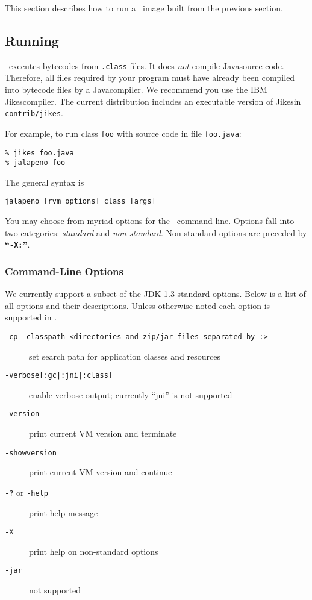 This section describes how to run a \jp\ image built from the previous
section. 

\subsection{Running \jp}

\jp\ executes bytecodes from {\tt .class} files. It does {\em not} compile
Java\trademark source code. Therefore, all files 
required by your program must have already been compiled into bytecode
files by a Java\trademark compiler.  We recommend you use the IBM Jikes\trademark compiler.
The current distribution includes an executable version of Jikes\trademark in
{\tt contrib/jikes}.

For example, to run class {\tt foo} with source code in file {\tt foo.java}:
\begin{verbatim}
% jikes foo.java
% jalapeno foo 
\end{verbatim}

The general syntax is
\begin{verbatim}
jalapeno [rvm options] class [args]
\end{verbatim}

You may choose from myriad options for the \jp\ command-line.  
Options fall into two categories: {\em standard} and {\em
non-standard}.  Non-standard options are preceded by {\bf ``{\tt -X:}''}.

\subsubsection{Command-Line Options}

We currently support a subset of the JDK 1.3 standard options.  Below
is a list of all options and their descriptions.  Unless otherwise noted each
option is supported in \jp.
\begin{description}
\item[{\tt -cp -classpath <directories and zip/jar files separated by :>}]
set search path for application classes and resources

\item[{\tt -verbose[:gc|:jni|:class]}]
enable verbose output; currently ``jni'' is not supported

\item[{\tt -version}] print current VM version and terminate

\item[{\tt -showversion}] print current VM version and continue

\item[{\tt -?} or {\tt -help}] print help message

\item[{\tt -X}] print help on non-standard options

\item[{\tt -jar}] not supported

\end{description}


